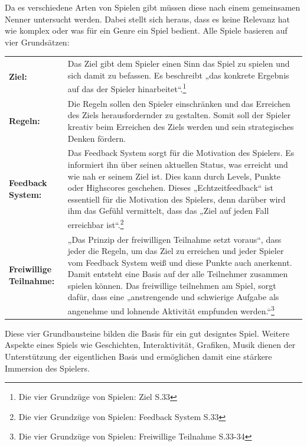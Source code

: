 Da es verschiedene Arten von Spielen gibt müssen diese  nach einem gemeinsamen Nenner untersucht werden. Dabei stellt sich heraus, dass es keine Relevanz hat wie komplex oder was für ein Genre ein Spiel bedient. Alle Spiele basieren auf vier Grundsätzen:
\begin{savenotes}
\begin{table}[H]
\centering
\renewcommand{\arraystretch}{1.5}
\begin{tabular}{lp{11.9cm}}

\textbf{Ziel:} & Das Ziel  gibt dem Spieler einen Sinn das Spiel zu spielen und sich damit zu befassen. Es beschreibt „das konkrete Ergebnis auf das der Spieler hinarbeitet“.\footnote{Die vier Grundzüge von Spielen: Ziel \cite{janemcgonigal2012} S.33}\\

\textbf{Regeln:} &Die Regeln sollen den Spieler einschränken und das Erreichen des Ziels herausfordernder zu gestalten. Somit soll der Spieler kreativ beim Erreichen des Ziels werden und sein  strategisches Denken fördern.\\

\textbf{Feedback System:} & Das Feedback System sorgt für die Motivation des Spielers. Es informiert ihn über seinen aktuellen Status, was erreicht und wie nah er seinem Ziel ist. Dies kann durch Levels, Punkte oder Highscores geschehen.  Dieses „Echtzeitfeedback“ ist essentiell für die Motivation des Spielers, denn darüber wird ihm das Gefühl vermittelt, dass das „Ziel auf jeden Fall erreichbar ist“.\footnote{Die vier Grundzüge von Spielen: Feedback System \cite{janemcgonigal2012} S.33}\\

\textbf{Freiwillige Teilnahme:} & „Das Prinzip der freiwilligen Teilnahme setzt voraus“, dass jeder die Regeln, um das Ziel zu erreichen und jeder Spieler vom Feedback System weiß und diese Punkte auch anerkennt. Damit entsteht eine Basis auf der alle Teilnehmer zusammen spielen können. Das freiwillige teilnehmen am Spiel, sorgt dafür, dass eine „anstrengende und schwierige Aufgabe als angenehme und lohnende Aktivität empfunden werden.“\footnote{Die vier Grundzüge von Spielen: Freiwillige Teilnahme\cite{janemcgonigal2012} S.33-34}

\end{tabular}
\end{table}
\end{savenotes}

Diese vier Grundbausteine bilden die Basis für ein gut designtes Spiel. Weitere Aspekte eines Spiels wie Geschichten, Interaktivität, Grafiken, Musik dienen der Unterstützung der eigentlichen Basis und ermöglichen damit eine stärkere Immersion des Spielers.

